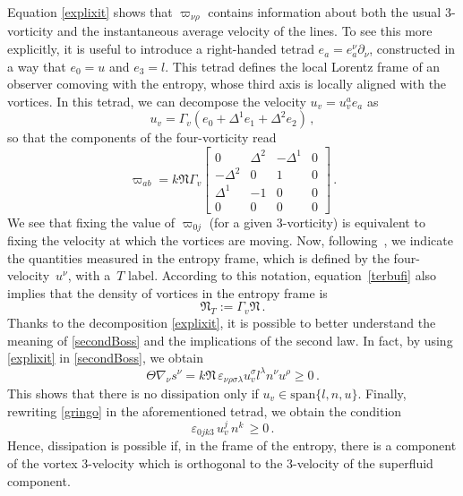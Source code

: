 \documentclass[preprints,article,accept,moreauthors,pdftex]{mdpi}
\begin{document}
Equation \eqref{explixit} shows that $\varpi_{\nu \rho}$ contains information about both the usual 3-vorticity and the instantaneous average velocity of the lines. 
To see this more explicitly, it is useful to introduce a right-handed tetrad $e_a = e_a^\nu \partial_\nu$, constructed in a way that $e_0=u$ and $e_3=l$. This tetrad defines the local Lorentz frame of an observer comoving with the entropy, whose third axis is locally aligned with the vortices. In this tetrad, we can decompose the velocity $u_v= u_v^a e_a$ as 
\begin{equation}
\label{uvintetrad}
u_v=\Gamma_v(e_0+\Delta^1 e_1 +\Delta^2 e_2) \, ,
\end{equation}
so that the components of the four-vorticity read
\begin{equation}
\label{terbufi}
\varpi_{ab} = k \mathfrak{N} \Gamma_v 
\begin{bmatrix}
   0 & \Delta^2 & -\Delta^1 & 0  \\
    -\Delta^2 & 0 & 1 & 0  \\
    \Delta^1 & -1  & 0 & 0  \\
    0 & 0 & 0 & 0
\end{bmatrix} \, .
\end{equation}
We see that fixing the value of $\varpi_{0j}$ (for a given 3-vorticity) is equivalent to fixing the velocity at which the vortices are moving.
Now, following~\cite{Termo}, we indicate the quantities measured in the entropy frame, which is defined by the four-velocity~$u^\nu$, with a~$T$ label. 
According to this notation, equation~\eqref{terbufi} also implies that the density of vortices in the entropy frame is 
\begin{equation}
\label{thermalDensityVortex}
\mathfrak{N}_{T} := \Gamma_v \mathfrak{N} \, .
\end{equation}
Thanks to the decomposition \eqref{explixit}, it is possible to  better understand the meaning of \eqref{secondBoss} and the implications of the second law. 
In fact, by using \eqref{explixit} in \eqref{secondBoss}, we obtain
\begin{equation}
\label{gringo}
\Theta \nabla_\nu s^\nu = k \mathfrak{N} \, \varepsilon_{\nu \rho \sigma \lambda} u_v^\sigma l^\lambda  n^\nu u^\rho \geq 0 \, .
\end{equation} 
This shows that there is no dissipation only if $u_v \in \text{span} \{ l, n,u \}$. 
Finally, rewriting \eqref{gringo} in the aforementioned tetrad, we obtain the condition
\begin{equation}
\label{bufaloscemo}
\varepsilon_{0jk3} \, u_v^j \, n^k \, \geq 0 \, .
\end{equation}
Hence, dissipation is possible if, in the frame of the entropy, there is a component of the  vortex 3-velocity which is orthogonal to the 3-velocity of the superfluid component. 
\end{document}
